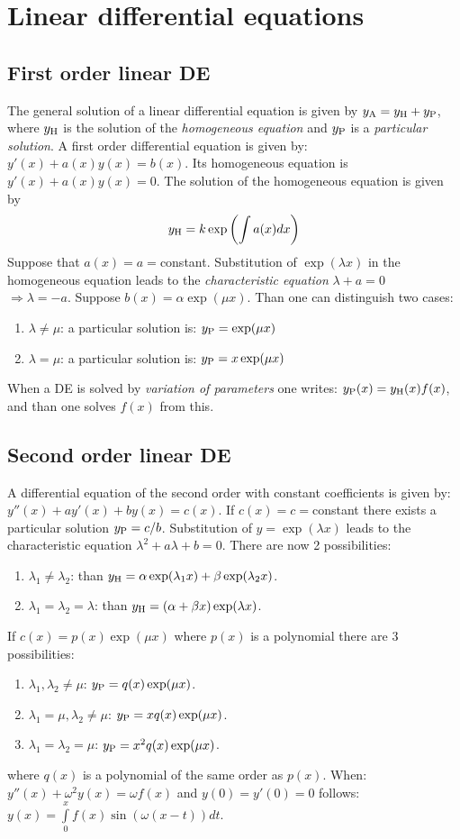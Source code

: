 \section{Linear differential equations}
\subsection{First order linear DE}
The general solution of a linear differential equation is given by
$y_{\rm A}=y_{\rm H}+y_{\rm P}$, where $y_{\rm H}$ is the solution of the
{\it homogeneous equation} and $y_{\rm P}$ is a {\it particular solution}.
\npar
A first order differential equation is given by: $y'(x)+a(x)y(x)=b(x)$.
Its homogeneous equation is $y'(x)+a(x)y(x)=0$.
\npar
The solution of the homogeneous equation is given by
\[
y_{\rm H}=k\exp\left(\int a(x)dx\right)
\]
Suppose that $a(x)=a=$constant.
\npar
Substitution of $\exp(\lambda x)$ in the homogeneous equation leads to the
{\it characteristic equation} $\lambda+a=0$\\ $\Rightarrow\lambda=-a$.
\npar
Suppose $b(x)=\alpha\exp(\mu x)$. Than one can distinguish two cases:
\begin{enumerate}
\item $\lambda\neq\mu$: a particular solution is: $y_{\rm P}=\exp(\mu x)$
\item $\lambda=\mu$: a particular solution is: $y_{\rm P}=x\exp(\mu x)$
\end{enumerate}
\npar
When a DE is solved by {\it variation of parameters} one writes:
$y_{\rm P}(x)=y_{\rm H}(x)f(x)$, and than one solves $f(x)$ from this.

\subsection{Second order linear DE}
A differential equation of the second order with constant coefficients is given
by: $y''(x)+ay'(x)+by(x)=c(x)$. If $c(x)=c=$constant there exists a particular
solution $y_{\rm P}=c/b$.
\npar
Substitution of $y=\exp(\lambda x)$ leads to the characteristic equation
$\lambda^2+a\lambda+b=0$.
\npar
There are now 2 possibilities:
\begin{enumerate}
\item $\lambda_1\neq\lambda_2$: than $y_{\rm H}=\alpha\exp(\lambda_1 x)+\beta\exp(\lambda_2 x)$.
\item $\lambda_1=\lambda_2=\lambda$: than $y_{\rm H}=(\alpha +\beta x)\exp(\lambda x)$.
\end{enumerate}
\npar
If $c(x)=p(x)\exp(\mu x)$ where $p(x)$ is a polynomial there are 3 possibilities:
\begin{enumerate}
\item $\lambda_1,\lambda_2\neq\mu$: $y_{\rm P}=q(x)\exp(\mu x)$.
\item $\lambda_1=\mu,\lambda_2\neq\mu$: $y_{\rm P}=xq(x)\exp(\mu x)$.
\item $\lambda_1=\lambda_2=\mu$: $y_{\rm P}=x^2q(x)\exp(\mu x)$.
\end{enumerate}
where $q(x)$ is a polynomial of the same order as $p(x)$.
\npar
When: $y''(x)+\omega^2y(x)=\omega f(x)$ and $y(0)=y'(0)=0$ follows:
$y(x)=\int\limits_0^xf(x)\sin(\omega(x-t))dt$.

